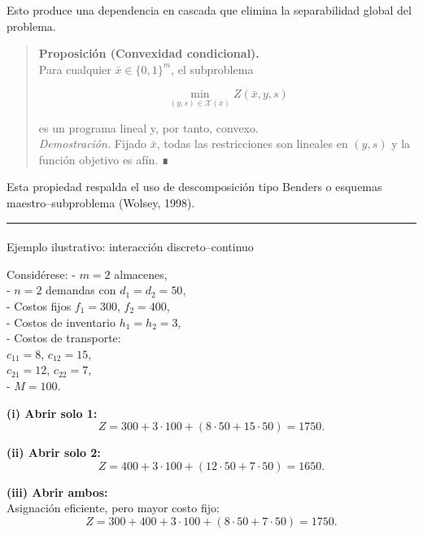 \documentclass[
  spanish,
  letterpaper,
  DIV=11,
  numbers=noendperiod]{scrartcl}
\makeatletter
\let\oldparagraph\paragraph
\renewcommand{\paragraph}{
    \@ifstar
      \xxxParagraphStar
      \xxxParagraphNoStar
  }
\newcommand{\xxxParagraphStar}[1]{\oldparagraph*{#1}\mbox{}}
\newcommand{\xxxParagraphNoStar}[1]{\oldparagraph{#1}\mbox{}}
\makeatother
\begin{document}
Esto produce una dependencia en cascada que elimina la separabilidad
global del problema.

\begin{quote}
\textbf{Proposición (Convexidad condicional).}\\
Para cualquier \(\bar{x} \in \{0,1\}^m\), el subproblema

\[
\min_{(y,s) \in \mathcal{X}(\bar{x})} Z(\bar{x}, y, s)
\]

es un programa lineal y, por tanto, convexo.\\
\emph{Demostración.} Fijado \(\bar{x}\), todas las restricciones son
lineales en \((y,s)\) y la función objetivo es afín. ∎
\end{quote}

Esta propiedad respalda el uso de descomposición tipo Benders o esquemas
maestro--subproblema (Wolsey, 1998).

\begin{center}\rule{0.5\linewidth}{0.5pt}\end{center}

\paragraph{Ejemplo ilustrativo: interacción
discreto--continuo}\label{ejemplo-ilustrativo-interacciuxf3n-discretocontinuo}

Considérese: - \(m=2\) almacenes,\\
- \(n=2\) demandas con \(d_1=d_2=50\),\\
- Costos fijos \(f_1=300\), \(f_2=400\),\\
- Costos de inventario \(h_1=h_2=3\),\\
- Costos de transporte:\\
\(c_{11}=8\), \(c_{12}=15\),\\
\(c_{21}=12\), \(c_{22}=7\),\\
- \(M=100\).

\textbf{(i) Abrir solo 1:}\\
\[
Z = 300 + 3\cdot 100 + (8\cdot 50 + 15\cdot 50)=1750.
\]

\textbf{(ii) Abrir solo 2:}\\
\[
Z = 400 + 3\cdot 100 + (12\cdot 50 + 7\cdot 50)=1650.
\]

\textbf{(iii) Abrir ambos:}\\
Asignación eficiente, pero mayor costo fijo:\\
\[
Z = 300 + 400 + 3\cdot 100 + (8\cdot 50 + 7\cdot 50)=1750.
\]
\end{document}
